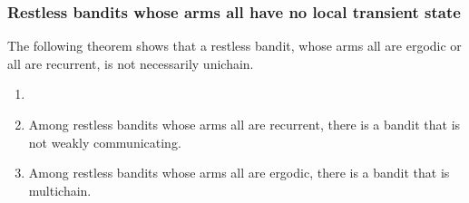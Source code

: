 \subsubsection{Restless bandits whose arms all have no local transient state}

The following theorem shows that a restless bandit, whose arms all are ergodic or all are recurrent, is not necessarily unichain.

\begin{thm}
    \label{thm:multichain}
    \begin{enumerate}[label=(\roman*)]
        \item[]
        \item \label{thm:not_ergodic} Among restless bandits whose arms all are recurrent, there is a bandit that is not weakly communicating. %
        \item \label{thm:ergodic_arms_multichain_RB} Among restless bandits whose arms all are ergodic, there is a bandit that is multichain.
    \end{enumerate}
\end{thm}

